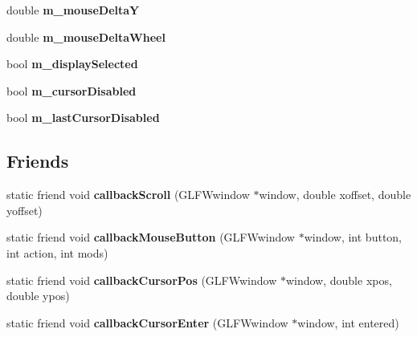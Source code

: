 \begin{DoxyCompactItemize}
double {\bfseries m\+\_\+mouse\+DeltaY}
\item 
\mbox{\label{classflounder_1_1mouse_a9752c8de1cb1d0b49a59fd7370be04b8}} 
double {\bfseries m\+\_\+mouse\+Delta\+Wheel}
\item 
\mbox{\label{classflounder_1_1mouse_aef845f201f2959e32a1e5088287232f9}} 
bool {\bfseries m\+\_\+display\+Selected}
\item 
\mbox{\label{classflounder_1_1mouse_aea8d32ce7f05af0534955ec7c7a02b73}} 
bool {\bfseries m\+\_\+cursor\+Disabled}
\item 
\mbox{\label{classflounder_1_1mouse_a70f14e869e72e0dc39de8f6c4c4a236e}} 
bool {\bfseries m\+\_\+last\+Cursor\+Disabled}
\end{DoxyCompactItemize}
\subsection*{Friends}
\begin{DoxyCompactItemize}
\item 
\mbox{\label{classflounder_1_1mouse_af1c7c994792a177bf1c04b724f27ab0e}} 
static friend void {\bfseries callback\+Scroll} (G\+L\+F\+Wwindow $\ast$window, double xoffset, double yoffset)
\item 
\mbox{\label{classflounder_1_1mouse_af35ab5226ee16fed45097a267eab6651}} 
static friend void {\bfseries callback\+Mouse\+Button} (G\+L\+F\+Wwindow $\ast$window, int button, int action, int mods)
\item 
\mbox{\label{classflounder_1_1mouse_a8544e2566e40a897e95f523d720f2740}} 
static friend void {\bfseries callback\+Cursor\+Pos} (G\+L\+F\+Wwindow $\ast$window, double xpos, double ypos)
\item 
\mbox{\label{classflounder_1_1mouse_afe0c23a3b013f6386b71136f194cff81}} 
static friend void {\bfseries callback\+Cursor\+Enter} (G\+L\+F\+Wwindow $\ast$window, int entered)
\end{DoxyCompactItemize}


